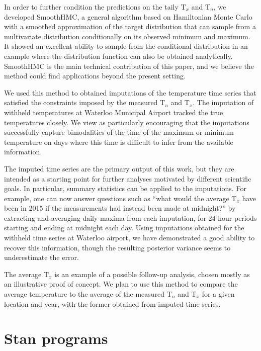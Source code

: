\documentclass[letter]{article}
\newcommand{\T}{\mathrm{T}}
\newcommand{\Tn}{\T_{n}}
\newcommand{\Tx}{\T_{x}}
\begin{document}
In order to further condition the predictions on the taily \(\Tx\) and \(\Tn\), we developed SmoothHMC, a general algorithm based on Hamiltonian Monte Carlo with a smoothed approximation of the target distribution that can sample from a multivariate distribution conditionally on its observed minimum and maximum.
It showed an excellent ability to sample from the conditional distribution in an example where the distribution function can also be obtained analytically.
SmoothHMC is the main technical contribution of this paper, and we believe the method could find applications beyond the present setting.

We used this method to obtained imputations of the temperature time series that satisfied the constraints imposed by the measured \(\Tn\) and \(\Tx\).
The imputation of withheld temperatures at Waterloo Municipal Airport tracked the true temperatures closely.
We view as particularly encouraging that the imputations successfully capture bimodalities of the time of the maximum or minimum temperature on days where this time is difficult to infer from the available information.
    


        The imputed time series are the primary output of this work, but they are intended as a starting point for further analyses motivated by different scientific goals.
In particular, summary statistics can be applied to the imputations.
For example, one can now answer questions such as ``what would the average \(\Tx\) have been in 2015 if the measurements had instead been made at midnight?'' by extracting and averaging daily maxima from each imputation, for 24 hour periods starting and ending at midnight each day.
Using imputations obtained for the withheld time series at Waterloo airport, we have demonstrated a good ability to recover this information, though the resulting posterior variance seems to underestimate the error.

The average \(\Tx\) is an example of a possible follow-up analysis, chosen mostly as an illustrative proof of concept.
We plan to use this method to compare the average temperature to the average of the measured \(\Tn\) and \(\Tx\) for a given location and year, with the former obtained from imputed time series.
    

\appendix
        \section{Stan programs}\label{stan-programs}
\end{document}
